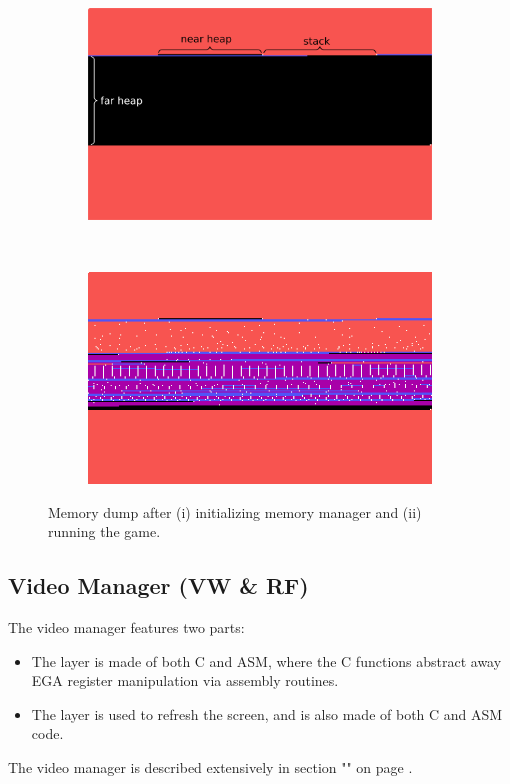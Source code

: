 \documentclass[book.tex]{subfiles}
\begin{document}
\begin{figure}[H]
	\centering
	\begin{subfigure}{1.0\linewidth}
		\includegraphics[width=\linewidth]{screenshots_300dpi/mm_dump_start_text.png}
	\end{subfigure}\\
	\vspace{3em}
	\begin{subfigure}{1.0\linewidth}
		\includegraphics[width=\linewidth]{screenshots_300dpi/mm_dump_run.png}
	\end{subfigure}
	\caption{Memory dump after (i) initializing memory manager and (ii) running the game.}
	\label{fig:subfigures}
\end{figure}


\subsection{Video Manager (VW \& RF)}
The video manager features two parts:
\begin{itemize}
\item The  layer is made of both C and ASM, where the C functions abstract away EGA register manipulation via assembly routines. 
\item The  layer is used to refresh the screen, and is also made of both C and ASM code.
\end{itemize}
The video manager is described extensively in section "" on page \pageref{section:adaptive_tile_refresh}.
\end{document}
